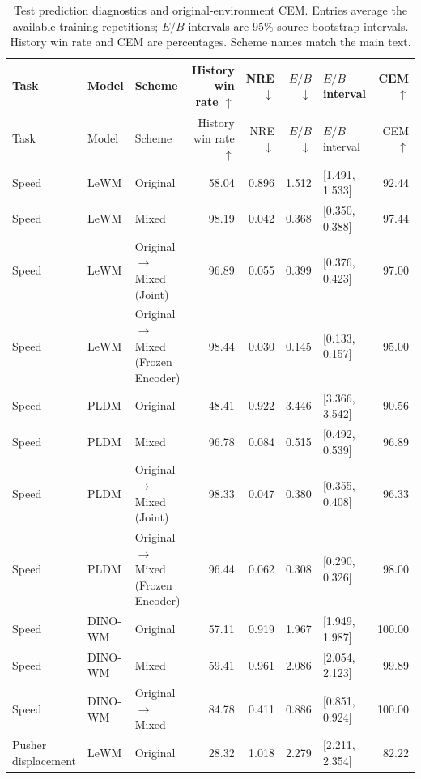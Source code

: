 
\begingroup
\small
\setlength{\tabcolsep}{3pt}
\renewcommand{\arraystretch}{1.15}
\begin{longtable}{@{}p{1.8cm}lp{3.65cm}rrrp{2.5cm}r@{}}
\caption{Test prediction diagnostics and original-environment CEM. Entries average the available training repetitions; $E/B$ intervals are 95\% source-bootstrap intervals. History win rate and CEM are percentages. Scheme names match the main text.}\label{tab:test-diagnostics}\\
\toprule
Task & Model & Scheme & \shortstack{History\\win rate $\uparrow$} & NRE $\downarrow$ & $E/B$ $\downarrow$ & $E/B$ interval & CEM $\uparrow$\\
\midrule
\endfirsthead
\toprule
Task & Model & Scheme & \shortstack{History\\win rate $\uparrow$} & NRE $\downarrow$ & $E/B$ $\downarrow$ & $E/B$ interval & CEM $\uparrow$\\
\midrule
\endhead
\bottomrule
\endfoot
Speed & LeWM & Original & 58.04 & 0.896 & 1.512 & [1.491, 1.533] & 92.44 \\
Speed & LeWM & Mixed & 98.19 & 0.042 & 0.368 & [0.350, 0.388] & 97.44 \\
Speed & LeWM & Original $\rightarrow$ Mixed (Joint) & 96.89 & 0.055 & 0.399 & [0.376, 0.423] & 97.00 \\
Speed & LeWM & Original $\rightarrow$ Mixed (Frozen Encoder) & 98.44 & 0.030 & 0.145 & [0.133, 0.157] & 95.00 \\
Speed & PLDM & Original & 48.41 & 0.922 & 3.446 & [3.366, 3.542] & 90.56 \\
Speed & PLDM & Mixed & 96.78 & 0.084 & 0.515 & [0.492, 0.539] & 96.89 \\
Speed & PLDM & Original $\rightarrow$ Mixed (Joint) & 98.33 & 0.047 & 0.380 & [0.355, 0.408] & 96.33 \\
Speed & PLDM & Original $\rightarrow$ Mixed (Frozen Encoder) & 96.44 & 0.062 & 0.308 & [0.290, 0.326] & 98.00 \\
Speed & DINO-WM & Original & 57.11 & 0.919 & 1.967 & [1.949, 1.987] & 100.00 \\
Speed & DINO-WM & Mixed & 59.41 & 0.961 & 2.086 & [2.054, 2.123] & 99.89 \\
Speed & DINO-WM & Original $\rightarrow$ Mixed & 84.78 & 0.411 & 0.886 & [0.851, 0.924] & 100.00 \\
\midrule
Pusher displacement & LeWM & Original & 28.32 & 1.018 & 2.279 & [2.211, 2.354] & 82.22 \\

\end{longtable}
